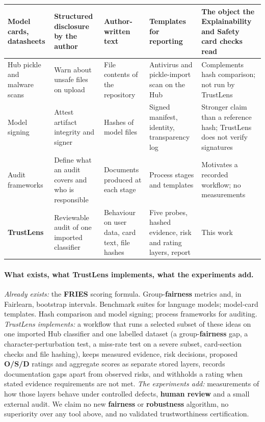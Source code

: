 \begin{table}[!htbp]
\begin{tabularx}{\textwidth}{|>{\raggedright\arraybackslash}p{2.1cm}|>{\raggedright\arraybackslash}p{2.7cm}|>{\raggedright\arraybackslash}p{2.6cm}|>{\raggedright\arraybackslash}p{3.1cm}|L|}
Model cards, datasheets \cite{mitchell2019,gebru2021} & Structured disclosure by the author & Author-written text & Templates for reporting & The object the Explainability and Safety card checks read\\ \hline
Hub pickle and malware scans \cite{hfpickle} & Warn about unsafe files on upload & File contents of the repository & Antivirus and pickle-import scan on the Hub & Complements hash comparison; not run by TrustLens\\ \hline
Model signing \cite{sigstoremodel} & Attest artifact integrity and signer & Hashes of model files & Signed manifest, identity, transparency log & Stronger claim than a reference hash; TrustLens does not verify signatures\\ \hline
Audit frameworks \cite{raji2020,mokander2023,nist2023} & Define what an audit covers and who is responsible & Documents produced at each stage & Process stages and templates & Motivates a recorded workflow; no measurements\\
\hline
\textbf{TrustLens} & Reviewable audit of one imported classifier & Behaviour on user data, card text, file hashes & Five probes, hashed evidence, risk and rating layers, report & This work\\
\hline
\end{tabularx}
\end{table}

\paragraph{What exists, what TrustLens implements, what the experiments add.}
\emph{Already exists:} the \textbf{FRIES} scoring formula. Group-\textbf{fairness} metrics and, in Fairlearn, bootstrap intervals. Benchmark suites for language models; model-card templates. Hash comparison and model signing; process frameworks for auditing. \emph{TrustLens implements:} a workflow that runs a selected subset of these ideas on one imported Hub classifier and one labelled dataset (a group-\textbf{fairness} gap, a character-perturbation test, a miss-rate test on a severe subset, card-section checks and file hashing), keeps measured evidence, risk decisions, proposed \textbf{O/S/D} ratings and aggregate scores as separate stored layers, records documentation gaps apart from observed risks, and withholds a rating when stated evidence requirements are not met. \emph{The experiments add:} measurements of how those layers behave under controlled defects, \textbf{human review} and a small external audit. We claim no new \textbf{fairness} or \textbf{robustness} algorithm, no superiority over any tool above, and no validated trustworthiness certification.

